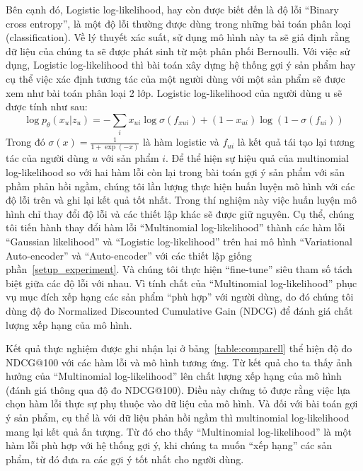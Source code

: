     Bên cạnh đó, Logistic log-likelihood, hay còn được biết đến là độ lỗi ``Binary cross entropy'', là một độ lỗi thường được dùng trong những bài toán phân loại (classification).
    Về lý thuyết xác suất, sử dụng mô hình này ta sẽ giả định rằng dữ liệu của chúng ta sẽ được phát sinh từ một phân phối Bernoulli. 
    Với việc sử dụng, Logistic log-likelihood thì bài toán xây dựng hệ thống gợi ý sản phẩm hay cụ thể việc xác định tương tác của một người dùng với một sản phẩm sẽ được xem như bài toán phân loại 2 lớp. 
    Logistic log-likelihood của người dùng u sẽ được tính như sau:
    \begin{equation}
        \log p_\theta(x_u|z_u) = -\sum_i x_{ui}\log \sigma(f_{xui}) + (1-x_{ui})\log(1 - \sigma(f_{ui}))
    \end{equation}
    Trong đó $\sigma(x) = \frac{1}{1+\exp (-x)}$ là hàm logistic và  $f_{ui}$ là kết quả tái tạo lại tương tác của người dùng $u$ với sản phẩm $i$.
    Để thể hiện sự hiệu quả của multinomial log-likelihood so với hai hàm lỗi còn lại trong bài toán gợi ý sản phẩm với sản phầm phản hồi ngầm, chúng tôi lần lượng thực hiện huấn luyện mô hình với các độ lỗi trên và ghi lại kết quả tốt nhất. 
    Trong thí nghiệm này việc huấn luyện mô hình chỉ thay đổi độ lỗi và các thiết lập khác sẽ được giữ nguyên.
    Cụ thể, chúng tôi tiến hành thay đổi hàm lỗi ``Multinomial log-likelihood'' thành các hàm lỗi ``Gaussian likelihood'' và ``Logistic log-likelihood'' trên hai mô hình ``Variational Auto-encoder'' và ``Auto-encoder'' với các thiết lập giống phần~\ref{setup_experiment}.
    Và chúng tôi thực hiện ``fine-tune'' siêu tham số tách biệt giữa các độ lỗi với nhau.
    Vì tính chất của ``Multinomial log-likelihood'' phục vụ mục đích xếp hạng các sản phẩm ``phù hợp'' với người dùng, do đó chúng tôi dùng độ đo Normalized Discounted Cumulative Gain (NDCG) để đánh giá chất lượng xếp hạng của mô hình. 
    
    Kết quả thực nghiệm được ghi nhận lại ở bảng~\ref{table:comparell} thể hiện độ đo NDCG@100 với các hàm lỗi và mô hình tương ứng. 
    Từ kết quả cho ta thấy ảnh hưởng của ``Multinomial log-likelihood'' lên chất lượng xếp hạng của mô hình (đánh giá thông qua độ đo NDCG@100). 
    Điều này chứng tỏ được rằng việc lựa chọn hàm lỗi thực sự phụ thuộc vào dữ liệu của mô hình. 
    Và đối với bài toán gợi ý sản phẩm, cụ thể là với dữ liệu phản hồi ngầm thì multinomial log-likelihood mang lại kết quả ấn tượng. 
    Từ đó cho thấy ``Multinomial log-likelihood'' là một hàm lỗi phù hợp với hệ thống gợi ý, khi chúng ta muốn ``xếp hạng'' các sản phẩm, từ đó đưa ra các gợi ý tốt nhất cho người dùng.            

